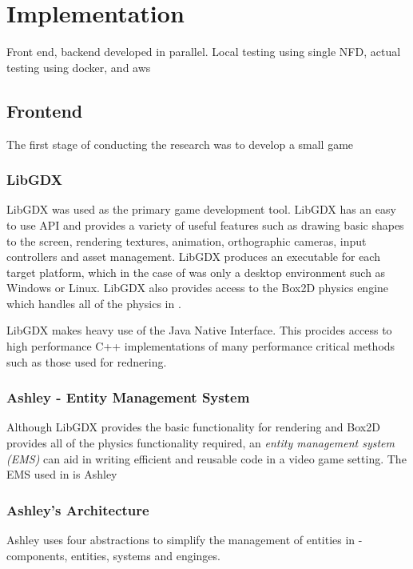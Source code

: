 \chapter{Implementation}
Front end, backend developed in parallel. Local testing using single NFD, actual testing using docker, and aws

\section{Frontend}
The first stage of conducting the research was to develop a small game

\subsection{LibGDX}
LibGDX \cite{libgdx} was used as the primary game development tool. LibGDX has an easy to use API and provides a variety of useful features such as drawing basic shapes to the screen, rendering textures, animation, orthographic cameras, input controllers and asset management. LibGDX produces an executable for each target platform, which in the case of \game{} was only a desktop environment such as Windows or Linux. LibGDX also provides access to the Box2D \cite{box2d} physics engine which handles all of the physics in \game{}. 

LibGDX makes heavy use of the Java Native Interface. This procides access to high performance C++ implementations of many performance critical methods such as those used for rednering. 





\subsection{Ashley - Entity Management System}
Although LibGDX provides the basic functionality for rendering and Box2D provides all of the physics functionality required, an \textit{entity management system (EMS)} can aid in writing efficient and reusable code in a video game setting. The EMS used in \game{} is Ashley \cite{ashley}

\subsection{Ashley's Architecture}
Ashley uses four abstractions to simplify the management of entities in \game{} - components, entities, systems and enginges. 

